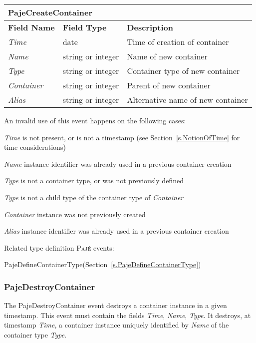 \documentclass[12pt]{article}
\newcommand{\Paje}{\textsc{Paj\'e}\xspace}
\newcommand{\PajeField}[1]{\emph{#1}\xspace}
\newcommand{\Time}{\PajeField{Time}}
\newcommand{\Name}{\PajeField{Name}}
\newcommand{\Type}{\PajeField{Type}}
\newcommand{\Container}{\PajeField{Container}}
\newcommand{\Alias}{\PajeField{Alias}}
\newcommand{\PajeEvent}[1]{\textsf{#1}\xspace}
\newcommand{\PajeDefineContainerType}{\PajeEvent{PajeDefineContainerType}}
\newcommand{\PajeCreateContainer}{\PajeEvent{PajeCreateContainer}}
\newcommand{\PajeDestroyContainer}{\PajeEvent{PajeDestroyContainer}}
\newenvironment{itemize*}%
               {\vspace{-1em}
                 \begin{itemize}%
                   \setlength{\itemsep}{0pt}%
                   \setlength{\parskip}{0pt}}%
               {\end{itemize}}
\begin{document}
\begin{tabular}{|LLL|}
\hline
\multicolumn{3}{|T|}{\textbf{\PajeCreateContainer}}\\\hline
\textbf{Field Name} & \textbf{Field Type} & \textbf{Description}\\\hline
\Time          & date              & Time of creation of container \\
\Name          & string or integer & Name of new container \\
\Type          & string or integer & Container type of new container \\
\Container     & string or integer & Parent of new container \\\hline
\Alias         & string or integer & Alternative name of new container \\
\hline
\end{tabular}

An invalid use of this event happens on the following cases:
\begin{itemize*}
\item \Time is not present, or is not a timestamp (see Section~\ref{s.NotionOfTime} for time considerations)
\item \Name instance identifier was already used in a previous container creation
\item \Type is not a container type, or was not previously defined
\item \Type is not a child type of the container type of \Container
\item \Container instance was not previously created
\item \Alias instance identifier was already used in a previous container creation
\end{itemize*}

Related type definition \Paje events:
\begin{itemize*}
\item \PajeDefineContainerType (Section~\ref{s.PajeDefineContainerType})
\end{itemize*}

\subsubsection{PajeDestroyContainer}
\label{s.PajeDestroyContainer}
The \PajeDestroyContainer event destroys a container instance in a
given timestamp. This event must contain the fields \Time, \Name,
\Type. It destroys, at timestamp \Time, a container instance uniquely
identified by \Name of the container type \Type.
\end{document}
